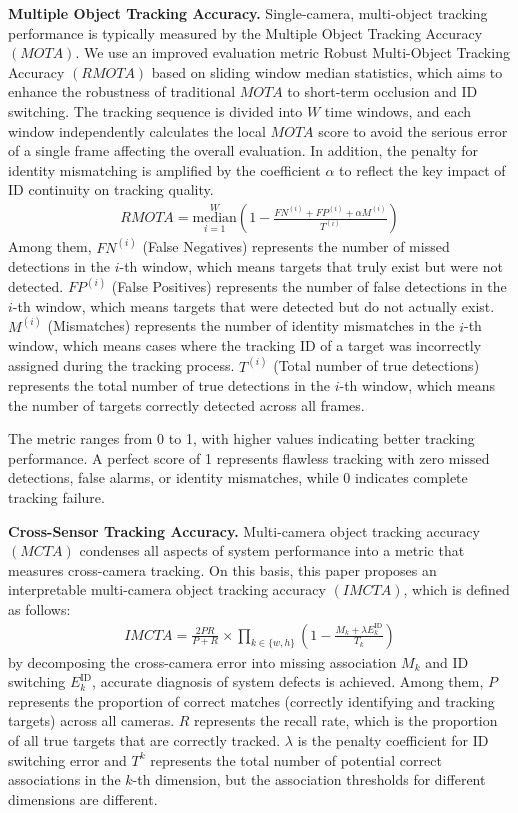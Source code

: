 \documentclass[lettersize,journal]{IEEEtran}
\begin{document}
\textbf{Multiple Object Tracking Accuracy.}
Single-camera, multi-object tracking performance is typically measured by the Multiple Object Tracking Accuracy \((MOTA)\)\cite{Alpher23b}.
We use an improved evaluation metric Robust Multi-Object Tracking Accuracy \((RMOTA)\) based on sliding window median statistics, which aims to enhance the robustness of traditional \(MOTA\) to short-term occlusion and ID switching.
The tracking sequence is divided into \(W\) time windows, and each window independently calculates the local \(MOTA\) score to avoid the serious error of a single frame affecting the overall evaluation.
In addition, the penalty for identity mismatching is amplified by the coefficient \(\alpha\) to reflect the key impact of ID continuity on tracking quality.
\begin{align}
	RMOTA = \underset{i=1}{\overset{W}{\mathrm{median}}} \left(1 - \frac{FN^{(i)} + FP^{(i)} + \alpha M^{(i)}}{T^{(i)}}\right) 
\end{align}
Among them,
\(FN^{(i)}\) (False Negatives) represents the number of missed detections in the \(i\)-th window, which means targets that truly exist but were not detected.
\(FP^{(i)}\) (False Positives) represents the number of false detections in the \(i\)-th window, which means targets that were detected but do not actually exist.
\(M^{(i)}\) (Mismatches) represents the number of identity mismatches in the \(i\)-th window, which means cases where the tracking ID of a target was incorrectly assigned during the tracking process.
\(T^{(i)}\) (Total number of true detections) represents the total number of true detections in the \(i\)-th window, which means the number of targets correctly detected across all frames.

The metric ranges from 0 to 1, with higher values indicating better tracking performance. 
A perfect score of 1 represents flawless tracking with zero missed detections, false alarms, or identity mismatches, while 0 indicates complete tracking failure.

\textbf{Cross-Sensor Tracking Accuracy.}
Multi-camera object tracking accuracy \((MCTA)\)\cite{Alpher23b} condenses all aspects of system performance into a metric that measures cross-camera tracking.
On this basis, this paper proposes an interpretable multi-camera object tracking accuracy \((IMCTA)\), which is defined as follows:
\begin{align}
	IMCTA = {\frac{2PR}{P + R}}_{\text{}} \times \prod_{k \in \{w, h\}} \left(1 - \frac{M_k + \lambda E_k^{\text{ID}}}{T_k}\right)
\end{align}
by decomposing the cross-camera error into missing association \(M_k\) and ID switching \(E_k^{\text{ID}}\), accurate diagnosis of system defects is achieved.
Among them,
\(P\) represents the proportion of correct matches (correctly identifying and tracking targets) across all cameras.  
\(R\) represents the recall rate, which is the proportion of all true targets that are correctly tracked.  
\(\lambda\) is the penalty coefficient for ID switching error and \(T^{k}\) represents the total number of potential correct associations in the \(k\)-th dimension, but the association thresholds for different dimensions are different.
\end{document}
